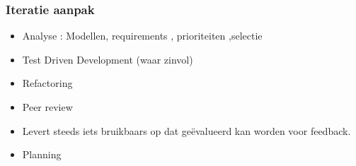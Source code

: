 \subsubsection{Iteratie aanpak}
\begin{itemize}
 \item Analyse : Modellen, requirements , prioriteiten ,selectie 
 \item Test Driven Development (waar zinvol) 
 \item Refactoring
 \item Peer review
 \item Levert steeds iets bruikbaars op dat ge\"evalueerd kan worden voor feedback.
 \item Planning
\end{itemize}



